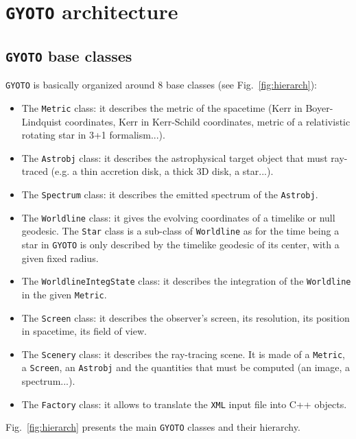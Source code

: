 \documentclass[a4paper,12pt]{article}
\begin{document}
\section{\texttt{GYOTO} architecture}
\label{archi}

\subsection{\texttt{GYOTO} base classes}

\texttt{GYOTO} is basically organized around 8 base classes (see Fig.~\ref{fig:hierarch}):

\begin{itemize}
\item The \texttt{Metric} class: it describes the metric of the spacetime (Kerr in Boyer-Lindquist coordinates, Kerr in Kerr-Schild coordinates, metric of a relativistic rotating star in 3+1 formalism...).
\item The \texttt{Astrobj} class: it describes the astrophysical target object that must ray-traced (e.g. a thin accretion disk, a thick 3D disk, a star...).
\item The \texttt{Spectrum} class: it describes the emitted spectrum of the \texttt{Astrobj}.
\item The \texttt{Worldline} class: it gives the evolving coordinates of a timelike or null geodesic. The \texttt{Star} class is a sub-class of \texttt{Worldline} as for the time being a star in \texttt{GYOTO} is only described by the timelike geodesic of its center, with a given fixed radius.
\item The \texttt{WorldlineIntegState} class: it describes the integration of the \texttt{Worldline} in the given \texttt{Metric}.
\item The \texttt{Screen} class: it describes the observer's screen, its resolution, its position in spacetime, its field of view.
\item The \texttt{Scenery} class: it describes the ray-tracing scene. It is made of a \texttt{Metric}, a \texttt{Screen}, an \texttt{Astrobj} and the quantities that must be computed (an image, a spectrum...).
\item The \texttt{Factory} class: it allows to translate the \texttt{XML} input file into C++ objects.
\end{itemize}

Fig.~\ref{fig:hierarch} presents the main \texttt{GYOTO} classes and their hierarchy.
\end{document}
